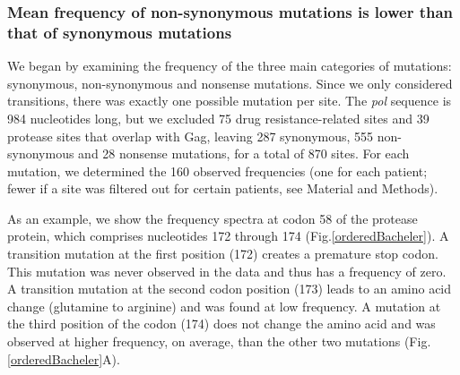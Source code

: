 \documentclass{article}
\begin{document}
\subsubsection*{Mean frequency of non-synonymous mutations is lower than that of synonymous mutations}
We began by examining the frequency of the three main categories of mutations: synonymous, non-synonymous and nonsense mutations.  
Since we only considered transitions, there was exactly one possible mutation per site. The \textit {pol} sequence is 984 nucleotides long, but we excluded 75 drug resistance-related sites and 39 protease sites that overlap with Gag, leaving 287 synonymous, 555 non-synonymous and 28 nonsense mutations, for a total of 870 sites. 
For each mutation, we determined the 160 observed frequencies (one for each patient; fewer if a site was filtered out for certain patients, see Material and Methods). 

As an example, we show the frequency spectra at codon 58 of the protease protein, which comprises nucleotides 172 through 174 (Fig.\ref{orderedBacheler}). A transition mutation at the first position (172) creates a premature stop codon. This mutation was never observed in the data and thus has a frequency of zero. A transition mutation at the second codon position (173) leads to an amino acid change (glutamine to arginine) and was found at low frequency. A mutation at the third position of the codon (174) does not change the amino acid and was observed at higher frequency, on average, than the other two mutations (Fig.\ref{orderedBacheler}A).  
\end{document}
